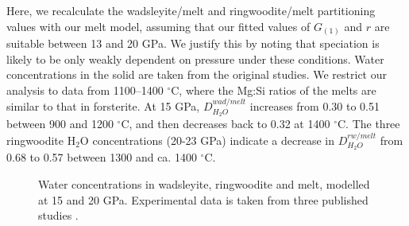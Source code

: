 \documentclass[review]{elsarticle}
\begin{document}
Here, we recalculate the wadsleyite/melt and ringwoodite/melt partitioning values with our melt model, assuming that our fitted values of $G_{(1)}$ and $r$ are suitable between 13 and 20 GPa. We justify this by noting that speciation is likely to be only weakly dependent on pressure under these conditions. Water concentrations in the solid are taken from the original studies. We restrict our analysis to data from 1100--1400 $^{\circ}$C, where the Mg:Si ratios of the melts are similar to that in forsterite. At 15 GPa, $D^{wad/melt}_{H_2O}$ increases from 0.30 to 0.51 between 900 and 1200 $^{\circ}$C, and then decreases back to 0.32 at 1400 $^{\circ}$C. The three ringwoodite H$_2$O concentrations (20-23 GPa) indicate a decrease in $D^{rw/melt}_{H_2O}$ from 0.68 to 0.57 between 1300 and ca. 1400 $^{\circ}$C.

\begin{figure}[ht!]
  \centering
  \caption{Water concentrations in wadsleyite, ringwoodite and melt, modelled at 15 and 20 GPa. Experimental data is taken from three published studies \citep{OMY2000,DDFK2005,LSOK2011}.}
  \label{fig:fo_wad_rw_melt}
\end{figure}
\end{document}
